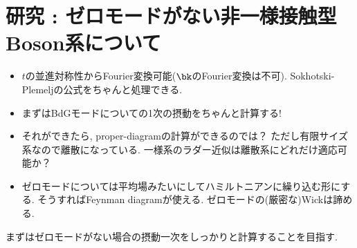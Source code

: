 \documentclass[10.5pt,a4paper]{jreport}
\begin{document}
\chapter{研究 : ゼロモードがない非一様接触型Boson系について}
\begin{itemize}
\item $t$の並進対称性からFourier変換可能($\bk$のFourier変換は不可). Sokhotski-Plemeljの公式をちゃんと処理できる.
\item まずはBdGモードについての1次の摂動をちゃんと計算する!
\item それができたら, proper-diagramの計算ができるのでは？ ただし有限サイズ系なので離散になっている. 一様系のラダー近似は離散系にどれだけ適応可能か？
\item ゼロモードについては平均場みたいにしてハミルトニアンに繰り込む形にする. そうすればFeynman diagramが使える. ゼロモードの(厳密な)Wickは諦める. 
\end{itemize}
まずはゼロモードがない場合の摂動一次をしっかりと計算することを目指す. 
\end{document}
